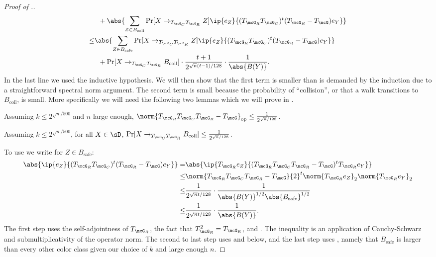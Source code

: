\begin{proof}[Proof of .]
\begin{align*}
    &\;\;+ \abs{\sum_{Z \in B_\text{coll}} \Pr[X \to_{T_{\mcG_C}T_{\mcG_R}} Z] \ip{e_Z}{(T_{\mcG_R}T_{\mcG_C})^t(T_{\mcG_R}-T_{\mcG}) e_Y}}\\
    \leq& \abs{\sum_{Z \in B_\text{safe}} \Pr[X \to_{T_{\mcG_C}T_{\mcG_R}} Z] \ip{e_Z}{(T_{\mcG_R}T_{\mcG_C})^t(T_{\mcG_R}-T_{\mcG}) e_Y}}\\
    &\;\;+ \Pr[X \to_{T_{\mcG_C}T_{\mcG_R}} B_{\text{coll}}] \cdot \frac{t+1}{2^{\sqrt{n}(t-1)/128}} \cdot \frac{1}{\abs{B(Y)}}.
\end{align*}
In the last line we used the inductive hypothesis. We will then show that the first term is smaller than is demanded by the induction due to a straightforward spectral norm argument. The second term is small because the probability of ``collision'', or that a walk transitions to $B_{\mathrm{coll}}$, is small. More specifically we will need the following two lemmas which we will prove in .
\begin{lemma}\label{lem:spectralnorm}
    Assuming $k \leq 2^{\sqrt{n}/500}$ and $n$ large enough, $\norm{T_{\mcG_R}T_{\mcG_C}T_{\mcG_R}-T_{\mcG}}_{\mathrm{op}} \leq \frac{1}{2^{\sqrt{n}/128}}$.
\end{lemma}

\begin{lemma}
\label{lem:lowcollprob}
    Assuming $k \leq 2^{\sqrt{n}/500}$, for all $X \in \sD$, $\Pr[X \to_{T_{\mcG_C}T_{\mcG_R}} B_\text{coll}] \leq \frac{1}{2^{\sqrt{n}/128}}$.
\end{lemma}
To use  we write for $Z \in B_{\mathrm{safe}}$:
\begin{align*}
    \abs{\ip{e_Z}{(T_{\mcG_R}T_{\mcG_C})^t(T_{\mcG_R}-T_{\mcG}) e_Y}} =& \abs{\ip{T_{\mcG_R}e_Z}{(T_{\mcG_R}T_{\mcG_C}T_{\mcG_R}-T_{\mcG})^t T_{\mcG_R} e_Y}} \\
    \leq& \norm{T_{\mcG_R}T_{\mcG_C}T_{\mcG_R}-T_{\mcG}}{2}^t \norm{T_{\mcG_R}e_Z}_{2} \norm{T_{\mcG_R}e_Y}_{2}\\
    \leq& \frac{1}{2^{\sqrt{n}t/128}} \cdot \frac{1}{\abs{B(Y)}^{1/2}\abs{B_\text{safe}}^{1/2}}\\
    \leq& \frac{1}{2^{\sqrt{n}t/128}} \cdot \frac{1}{\abs{B(Y)}}.
\end{align*}
The first step uses the self-adjointness of $T_{\mcG_R}$, the fact that $T_{\mcG_R}^2 = T_{\mcG_R}$, and . The inequality is an application of Cauchy-Schwarz and submultiplicativity of the operator norm. The second to last step uses  and  below, and the last step uses , namely that $B_{\mathrm{safe}}$ is larger than every other color class given our choice of $k$ and large enough $n$.


\end{proof}
